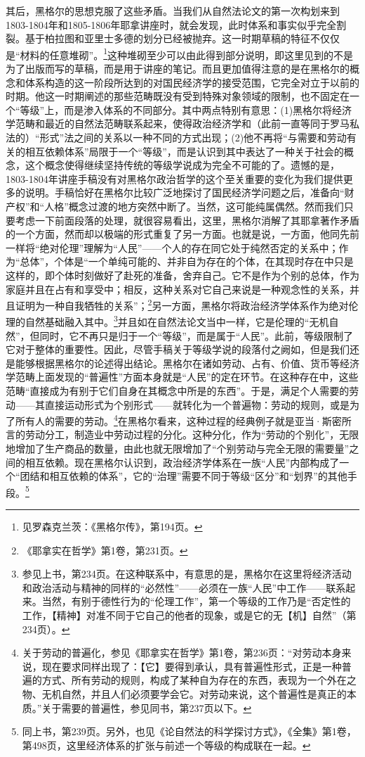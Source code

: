 其后，黑格尔的思想克服了这些矛盾。当我们从自然法论文的第一次构划来到1803-1804年和1805-1806年耶拿讲座时，就会发现，此时体系和事实似乎完全割裂。基于柏拉图和亚里士多德的划分已经被抛弃。这一时期草稿的特征不仅仅是“材料的任意堆砌”。\footnote{见罗森克兰茨：《黑格尔传》，第194页。}这种堆砌至少可以由此得到部分说明，即这里见到的不是为了出版而写的草稿，而是用于讲座的笔记。而且更加值得注意的是在黑格尔的概念和体系构造的这一阶段所达到的对国民经济学的接受范围，它完全对立于以前的时期。他这一时期阐述的那些范畴既没有受到特殊对象领域的限制，也不固定在一个“等级”上，而是渗入体系的不同部分。其中两点特别有意思：(1)黑格尔将经济学范畴和最近的自然法范畴联系起来，使得政治经济学和（此前一直等同于罗马私法的）“形式”法之间的关系以一种不同的方式出现；(2)他不再将“与需要和劳动有关的相互依赖体系”局限于一个“等级”，而是认识到其中表达了一种关于社会的概念，这个概念使得继续坚持传统的等级学说成为完全不可能的了。遗憾的是，1803-1804年讲座手稿没有对黑格尔政治哲学的这个至关重要的变化为我们提供更多的说明。手稿恰好在黑格尔比较广泛地探讨了国民经济学问题之后，准备向“财产权”和“人格”概念过渡的地方突然中断了。当然，这可能纯属偶然。然而我们只要考虑一下前面段落的处理，就很容易看出，这里，黑格尔消解了其耶拿著作矛盾的一个方面，然而却以极端的形式重复了另一方面。也就是说，一方面，他同先前一样将“绝对伦理”理解为“人民”——个人的存在同它处于纯然否定的关系中；作为“总体”，个体是“一个单纯可能的、并非自为存在的个体，在其现时存在中只是这样的，即个体时刻做好了赴死的准备，舍弃自己。它不是作为个别的总体，作为家庭并且在占有和享受中；相反，这种关系对它自己来说是一种观念性的关系，并且证明为一种自我牺牲的关系”；\footnote{《耶拿实在哲学》第1卷，第231页。}另一方面，黑格尔将政治经济学体系作为绝对伦理的自然基础融入其中。\footnote{参见上书，第234页。在这种联系中，有意思的是，黑格尔在这里将经济活动和政治活动与精神的同样的“必然性”——必须在一族“人民”中工作——联系起来。当然，有别于德性行为的“伦理工作”，第一个等级的工作乃是“否定性的工作，【精神】对准不同于它自己的他者的现象，或是它的无【机】自然”（第234页）。}并且如在自然法论文当中一样，它是伦理的“无机自然”，但同时，它不再只是归于一个“等级”，而是属于“人民”。此前，等级限制了它对于整体的重要性。因此，尽管手稿关于等级学说的段落付之阙如，但是我们还是能够根据黑格尔的论述得出结论。黑格尔在诸如劳动、占有、价值、货币等经济学范畴上面发现的“普遍性”方面本身就是“人民”的定在环节。在这种存在中，这些范畴“直接成为有别于它们自身在其概念中所是的东西”。于是，满足个人需要的劳动——其直接运动形式为个别形式——就转化为一个普遍物：劳动的规则，或是为了所有人的需要的劳动。\footnote{关于劳动的普遍化，参见《耶拿实在哲学》第1卷，第236页：“对劳动本身来说，现在要求同样出现了：【它】要得到承认，具有普遍性形式，正是一种普遍的方式、所有劳动的规则，构成了某种自为存在的东西，表现为一个外在之物、无机自然，并且人们必须要学会它。对劳动来说，这个普遍性是真正的本质。”关于需要的普遍性，参见同书，第237页以下。}在黑格尔看来，这种过程的经典例子就是亚当·斯密所言的劳动分工，制造业中劳动过程的分化。这种分化，作为“劳动的个别化”，无限地增加了生产商品的数量，由此也就无限增加了“个别劳动与完全无限的需要量”之间的相互依赖。现在黑格尔认识到，政治经济学体系在一族“人民”内部构成了一个“团结和相互依赖的体系”，它的“治理”需要不同于等级“区分”和“划界”的其他手段。\footnote{同上书，第239页。另外，也见《论自然法的科学探讨方式》，《全集》第1卷，第498页，这里经济体系的扩张与前述一个等级的构成联在一起。}

